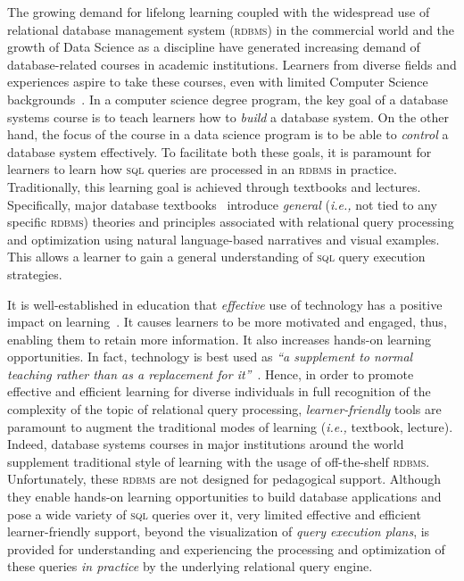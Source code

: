 \documentclass[11pt]{article}
\newcommand{\ie}{\emph{i.e.,}\xspace}
\begin{document}
The growing demand for lifelong learning coupled with the widespread use of relational database management system (\textsc{rdbms}) in the commercial world and the growth of Data Science as a discipline have generated increasing demand of database-related courses in academic institutions. Learners from diverse fields and experiences aspire to take these courses, even with limited Computer Science backgrounds~\cite{panel}. In a computer science degree program, the key goal of a database systems course is to teach learners how to \emph{build} a database system. On the other hand, the focus of the course in a data science program is to be able to \emph{control} a database system effectively. To facilitate both these goals, it is paramount for learners to learn  how \textsc{sql} queries are processed in an \textsc{rdbms} in practice. Traditionally, this learning goal is achieved through textbooks and lectures. Specifically, major database textbooks~\cite{dbtext,cow} introduce \textit{general} (\ie not tied to any specific \textsc{rdbms}) theories and principles associated with relational query processing and optimization using natural language-based narratives and visual examples. This allows a learner to gain a general understanding of \textsc{sql} query execution strategies. 

It is well-established in education that \textit{effective} use of technology has a positive impact on learning~\cite{HXK12}. It causes learners to be more motivated and engaged, thus, enabling them to retain more information. It also increases hands-on learning opportunities. In fact, technology is best used as \textit{``a supplement to normal teaching rather than as a replacement for it''}~\cite{HXK12}. Hence, in order to promote effective and efficient learning for diverse individuals in full recognition of the complexity of the topic of relational query processing,  \emph{learner-friendly} tools are paramount to  augment the traditional modes of learning (\ie textbook, lecture).  Indeed, database systems courses in major institutions around the world supplement traditional style of learning with the usage of off-the-shelf \textsc{rdbms}. Unfortunately, these \textsc{rdbms} are not designed for pedagogical support. Although they enable hands-on learning opportunities to build database applications and pose a wide variety of \textsc{sql} queries over it, very limited effective and efficient learner-friendly support, beyond the visualization of \textit{query execution plans}, is provided for understanding and experiencing the processing and optimization of these queries \textit{in practice} by the underlying relational query engine. 
\end{document}
